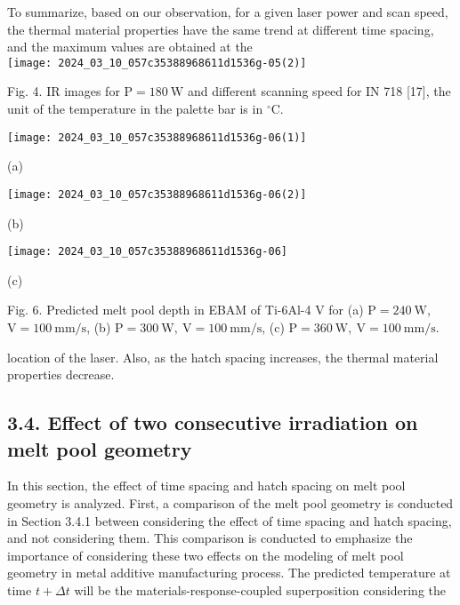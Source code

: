 \documentclass[10pt]{article}
\begin{document}
To summarize, based on our observation, for a given laser power and scan speed, the thermal material properties have the same trend at different time spacing, and the maximum values are obtained at the\\
\texttt{[image: 2024\_03\_10\_057c35388968611d1536g-05(2)]}

Fig. 4. IR images for $\mathrm{P}=180 \mathrm{~W}$ and different scanning speed for IN 718 [17], the unit of the temperature in the palette bar is in ${ }^{\circ} \mathrm{C}$.

\begin{center}
\texttt{[image: 2024\_03\_10\_057c35388968611d1536g-06(1)]}
\end{center}

(a)

\begin{center}
\texttt{[image: 2024\_03\_10\_057c35388968611d1536g-06(2)]}
\end{center}

(b)

\begin{center}
\texttt{[image: 2024\_03\_10\_057c35388968611d1536g-06]}
\end{center}

(c)

Fig. 6. Predicted melt pool depth in EBAM of Ti-6Al-4 V for (a) $\mathrm{P}=240 \mathrm{~W}$, $\mathrm{V}=100 \mathrm{~mm} / \mathrm{s}$, (b) $\mathrm{P}=300 \mathrm{~W}, \mathrm{~V}=100 \mathrm{~mm} / \mathrm{s}$, (c) $\mathrm{P}=360 \mathrm{~W}, \mathrm{~V}=100 \mathrm{~mm} / \mathrm{s}$.

location of the laser. Also, as the hatch spacing increases, the thermal material properties decrease.

\subsection*{3.4. Effect of two consecutive irradiation on melt pool geometry}
In this section, the effect of time spacing and hatch spacing on melt pool geometry is analyzed. First, a comparison of the melt pool geometry is conducted in Section 3.4.1 between considering the effect of time spacing and hatch spacing, and not considering them. This comparison is conducted to emphasize the importance of considering these two effects on the modeling of melt pool geometry in metal additive manufacturing process. The predicted temperature at time $t+\Delta t$ will be the materials-response-coupled superposition considering the
\end{document}
